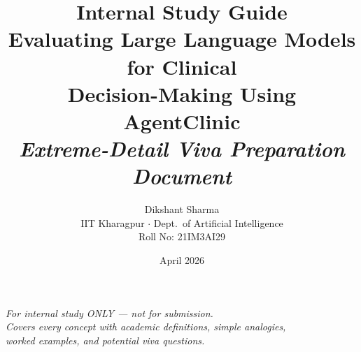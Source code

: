 \documentclass[12pt, a4paper]{article}
\title{\Huge\bfseries Internal Study Guide\\[0.5cm]
\Large Evaluating Large Language Models for Clinical\\Decision-Making Using AgentClinic\\[0.5cm]
\normalsize\textit{Extreme-Detail Viva Preparation Document}}
\author{Dikshant Sharma \\ IIT Kharagpur $\cdot$ Dept.\ of Artificial Intelligence \\ Roll No: 21IM3AI29}
\date{April 2026}
\begin{document}
\maketitle
\thispagestyle{empty}

\vfill
\begin{center}
\textit{For internal study ONLY --- not for submission.}\\
\textit{Covers every concept with academic definitions, simple analogies,}\\
\textit{worked examples, and potential viva questions.}
\end{center}
\vfill

\clearpage
\tableofcontents
\clearpage











\end{document}
